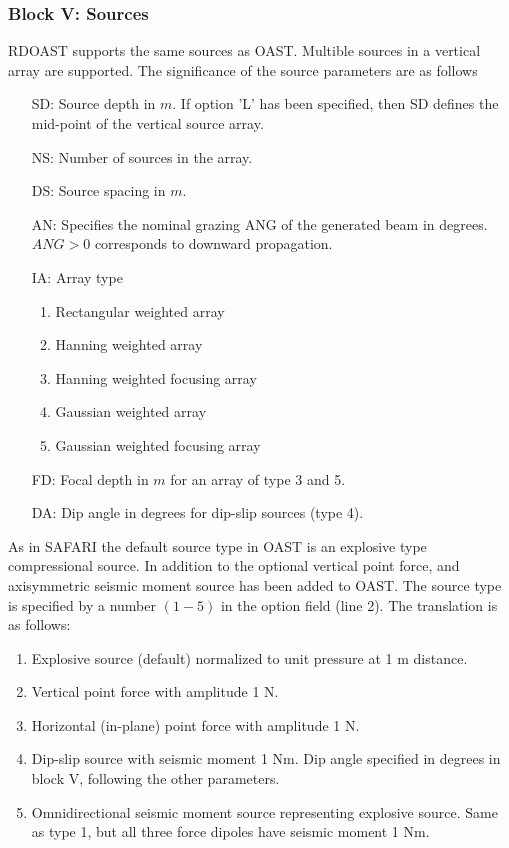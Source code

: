 \subsubsection{Block V: Sources}

    RDOAST supports the same sources as  OAST.  Multible sources in a  vertical  array  are 
supported. 
The significance of the
source parameters are as follows
\begin{itemize}
		\item[SD:] Source depth in $m$. If option 'L' has been 
		specified, then SD defines the mid-point of the vertical 
		source array.
		\item[NS:]	Number of sources in the array.
		\item[DS:] Source spacing in $m$.
		\item[AN:]  Specifies the nominal grazing ANG of the 
		generated beam in degrees. $ANG>0$ corresponds to
		downward propagation.
		\item[IA:]	Array type
			\begin{enumerate}
	        	\item Rectangular weighted array
		 	\item Hanning weighted array
		 	\item Hanning weighted focusing array
			\item Gaussian weighted array
			\item Gaussian weighted focusing array
			\end{enumerate}
		\item[FD:] Focal depth in $m$ for an array of type 3 and 5.
       		\item[DA:] Dip angle in degrees for dip-slip sources (type 4).
		\end{itemize}


\label{rdoastsout}  

As in SAFARI the default source type in OAST 
is an explosive type compressional source. In addition to the optional
vertical point force, and axisymmetric seismic moment source has been
added to OAST. The source type is specified by a number $(1-5)$ in the
option field (line 2). The translation is as follows:
\begin{enumerate}
\item Explosive source (default) normalized to unit pressure at 1 m distance.
\item Vertical point force with amplitude 1 N.
\item Horizontal (in-plane) point force with amplitude 1 N.
\item Dip-slip source with seismic moment 1 Nm. Dip angle specified in 
      degrees in block V, following the other parameters.
\item Omnidirectional seismic moment source representing explosive source. Same as type 1, but all three force dipoles have seismic moment 1 Nm.
\end{enumerate}

